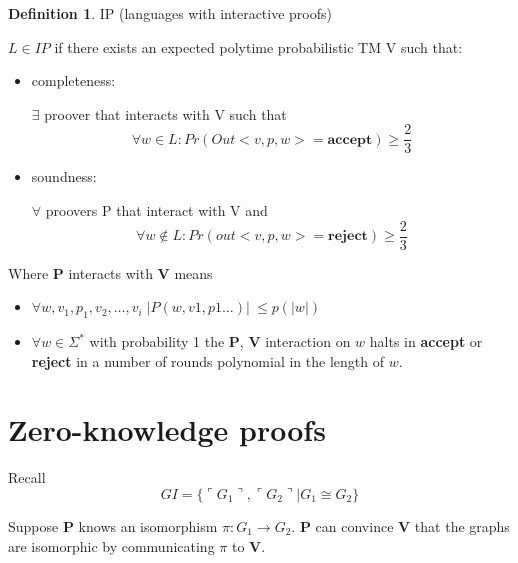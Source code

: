 \documentclass[a4paper,12pt]{article}
\theoremstyle{definition}
\newtheorem{definition}[counter]{Definition}
\theoremstyle{remark}
\begin{document}
\begin{definition}
    IP (languages with interactive proofs)

    $L \in IP $ if there exists an expected polytime probabilistic TM V such that:
    \begin{itemize}
        \item completeness:
        
        $\exists$ proover that interacts with V such that
        \begin{equation*}
            \forall w \in L: Pr(Out<v,p,w>=\textbf{accept}) \geq \frac{2}{3}
        \end{equation*}
        \item soundness:
        
        $\forall$ proovers P that interact with V and
        \begin{equation*}
            \forall w \notin L: Pr(out<v,p,w>=\textbf{reject}) \geq \frac{2}{3}
        \end{equation*}
    \end{itemize}

\end{definition}

Where \textbf{P} interacts with \textbf{V} means
\begin{itemize}
    \item $\forall w, v_1, p_1, v_2, \dots, v_i \; | P(w, v1, p1 \dots) | \: \leq p(|w|)$
    \item $\forall w \in \Sigma^* $ with probability 1 the \textbf{P}, \textbf{V} interaction on $w$ halts in \textbf{accept} or \textbf{reject} in a number of rounds 
    polynomial in the length of $w$.
\end{itemize}







\newpage
\section{Zero-knowledge proofs}

Recall
\begin{equation*}
    GI = \{\ulcorner G_1 \urcorner, \ulcorner G_2 \urcorner | G_1 \cong G_2\}
\end{equation*}

Suppose \textbf{P} knows an isomorphism $\pi: G_1 \to G_2$. \textbf{P} can convince \textbf{V} that the graphs are isomorphic by 
communicating $\pi$ to \textbf{V}.
\end{document}
